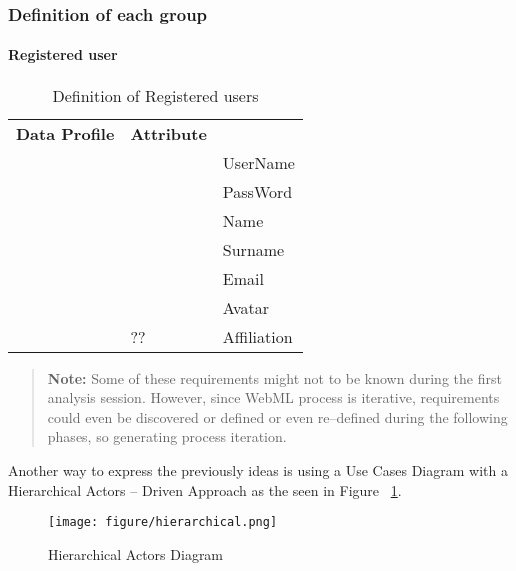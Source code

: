 \documentclass[a4paper]{memoir}
\begin{document}
		
		\subsubsection{Definition of each group}
		\paragraph{Registered user}
		
		\begin{table}[htbp]
		 
		\begin{tabular}{|l|l|l|}
		\hline
		\multicolumn{ 1}{|c|}{\textbf{Data Profile}} & \textbf{Attribute} &  \\ \cline{ 2- 3}
		\multicolumn{ 1}{|l|}{} &  & UserName \\ \cline{ 2- 3}
		\multicolumn{ 1}{|l|}{} &  & PassWord \\ \cline{ 2- 3}
		\multicolumn{ 1}{|l|}{} &  & Name \\ \cline{ 2- 3}
		\multicolumn{ 1}{|l|}{} &  & Surname \\ \cline{ 2- 3}
		\multicolumn{ 1}{|l|}{} &  & Email \\ \cline{ 2- 3}
		\multicolumn{ 1}{|l|}{} &  & Avatar \\ \cline{ 2- 3}
		\multicolumn{ 1}{|l|}{} & ?? & Affiliation \\ \hline
		\end{tabular}
		\label{tab:definitionAttributes}
		\caption{Definition of Registered users}
		   
		\end{table}
		\begin{quotation}
		\textbf{Note:} Some of these requirements might not to be known during the first analysis session.
		However, since \ac{WebML} process is iterative, requirements could even be discovered or defined or even re--defined during the following phases, so generating process iteration.
		\end{quotation}
 
		Another way to express the previously ideas is using a Use Cases Diagram with a Hierarchical Actors -- Driven Approach as the seen in Figure ~\ref{fig:hierarchicalActors}.
		
		\begin{figure}[here]
			\texttt{[image: figure/hierarchical.png]}
			\caption{Hierarchical Actors Diagram}
			\label{fig:hierarchicalActors}
		\end{figure}
		
\end{document}
